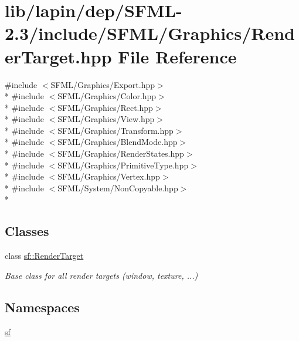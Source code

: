 \hypertarget{lapin_2dep_2_s_f_m_l-2_83_2include_2_s_f_m_l_2_graphics_2_render_target_8hpp}{\section{lib/lapin/dep/\-S\-F\-M\-L-\/2.3/include/\-S\-F\-M\-L/\-Graphics/\-Render\-Target.hpp File Reference}
\label{lapin_2dep_2_s_f_m_l-2_83_2include_2_s_f_m_l_2_graphics_2_render_target_8hpp}
}
{\ttfamily \#include $<$S\-F\-M\-L/\-Graphics/\-Export.\-hpp$>$}\\*
{\ttfamily \#include $<$S\-F\-M\-L/\-Graphics/\-Color.\-hpp$>$}\\*
{\ttfamily \#include $<$S\-F\-M\-L/\-Graphics/\-Rect.\-hpp$>$}\\*
{\ttfamily \#include $<$S\-F\-M\-L/\-Graphics/\-View.\-hpp$>$}\\*
{\ttfamily \#include $<$S\-F\-M\-L/\-Graphics/\-Transform.\-hpp$>$}\\*
{\ttfamily \#include $<$S\-F\-M\-L/\-Graphics/\-Blend\-Mode.\-hpp$>$}\\*
{\ttfamily \#include $<$S\-F\-M\-L/\-Graphics/\-Render\-States.\-hpp$>$}\\*
{\ttfamily \#include $<$S\-F\-M\-L/\-Graphics/\-Primitive\-Type.\-hpp$>$}\\*
{\ttfamily \#include $<$S\-F\-M\-L/\-Graphics/\-Vertex.\-hpp$>$}\\*
{\ttfamily \#include $<$S\-F\-M\-L/\-System/\-Non\-Copyable.\-hpp$>$}\\*
\subsection*{Classes}
\begin{DoxyCompactItemize}
\item 
class \hyperlink{classsf_1_1_render_target}{sf\-::\-Render\-Target}
\begin{DoxyCompactList}\small\item\em Base class for all render targets (window, texture, ...) \end{DoxyCompactList}\end{DoxyCompactItemize}
\subsection*{Namespaces}
\begin{DoxyCompactItemize}
\item 
\hyperlink{namespacesf}{sf}
\end{DoxyCompactItemize}
